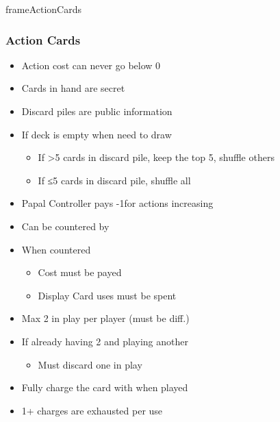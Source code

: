 \documentclass[10pt]{article}
\newlength{\fhActionCards} \setlength\fhActionCards{15\baselineskip}
\begin{document}
\begin{dynamiccontents*}{frameActionCards}\begin{eubox}{\fhActionCards}
	\begin{multicols}{2}
		\subsubsection*{Action Cards }
		\begin{itemize}
			\item Action cost can never go below 0
			\item Cards in hand are secret
			\item Discard piles are public information
			\item If deck is empty when need to draw 
			\begin{itemize}
				\item If >5 cards in discard pile, keep the top 5, shuffle others
				\item If ≤5 cards in discard pile, shuffle all
			\end{itemize}
			\item Papal Controller pays -1\adminpower for actions increasing \stability
		\end{itemize}
		\begin{itemize}
			\item Can be countered by 
			\item When countered
			\begin{itemize}
				\item Cost must be payed
				\item Display Card uses must be spent
			\end{itemize}
		\end{itemize}
		\begin{itemize}
			\item Max 2 in play per player (must be diff.)
			\item If already having 2 and playing another
			\begin{itemize}
				\item Must discard one in play
			\end{itemize}
			\item Fully charge the card with \cubes when played
			\item 1+ charges are exhausted per use
		\end{itemize}

\end{multicols}
\end{eubox}
\end{dynamiccontents*}
\end{document}
